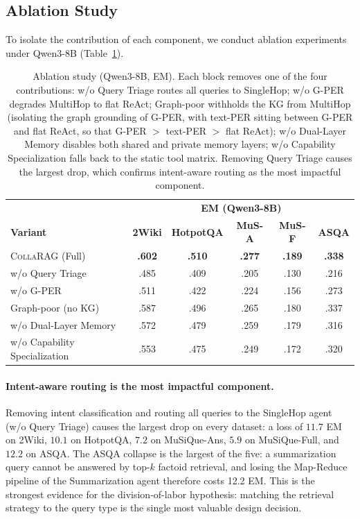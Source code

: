 \documentclass[11pt,a4paper]{article}
\newcommand{\sys}{\textsc{CollaRAG}}
\newcommand{\best}[1]{\textbf{#1}}
\begin{document}
\subsection{Ablation Study}
\label{sec:ablation}

To isolate the contribution of each component, we conduct ablation experiments under Qwen3-8B (Table~\ref{tab:ablation}).

\begin{table}[t]
\centering
\small
\setlength{\tabcolsep}{4.5pt}
\begin{tabular}{@{}l|ccccc@{}}
\toprule
& \multicolumn{5}{c}{\textbf{EM (Qwen3-8B)}} \\
\textbf{Variant} & \textbf{2Wiki} & \textbf{HotpotQA} & \textbf{MuS-A} & \textbf{MuS-F} & \textbf{ASQA} \\
\midrule
\sys{} (Full)              & \best{.602} & \best{.510} & \best{.277} & \best{.189} & \best{.338} \\
\midrule
w/o Query Triage           & .485 & .409 & .205 & .130 & .216 \\
w/o G-PER                  & .511 & .422 & .224 & .156 & .273 \\
Graph-poor (no KG)         & .587 & .496 & .265 & .180 & .337 \\
w/o Dual-Layer Memory      & .572 & .479 & .259 & .179 & .316 \\
w/o Capability Specialization & .553 & .475 & .249 & .172 & .320 \\
\bottomrule
\end{tabular}
\caption{Ablation study (Qwen3-8B, EM). Each block removes one of the four contributions: w/o Query Triage routes all queries to SingleHop; w/o G-PER degrades MultiHop to flat ReAct; Graph-poor withholds the KG from MultiHop (isolating the graph grounding of G-PER, with text-PER sitting between G-PER and flat ReAct, so that G-PER $>$ text-PER $>$ flat ReAct); w/o Dual-Layer Memory disables both shared and private memory layers; w/o Capability Specialization falls back to the static tool matrix. Removing Query Triage causes the largest drop, which confirms intent-aware routing as the most impactful component.}
\label{tab:ablation}
\end{table}

\paragraph{Intent-aware routing is the most impactful component.}
Removing intent classification and routing all queries to the SingleHop agent (w/o Query Triage) causes the largest drop on every dataset: a loss of $11.7$ EM on 2Wiki, $10.1$ on HotpotQA, $7.2$ on MuSiQue-Ans, $5.9$ on MuSiQue-Full, and $12.2$ on ASQA.
The ASQA collapse is the largest of the five: a summarization query cannot be answered by top-$k$ factoid retrieval, and losing the Map-Reduce pipeline of the Summarization agent therefore costs 12.2 EM.
This is the strongest evidence for the division-of-labor hypothesis: matching the retrieval strategy to the query type is the single most valuable design decision.
\end{document}

